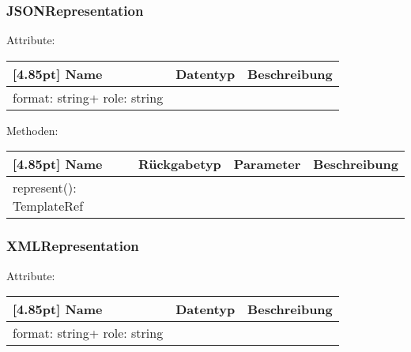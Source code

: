         	\subsubsection{JSONRepresentation}
        	
        	    Attribute:
                \begin{center}
                	\renewcommand{\arraystretch}{1.5}
                    \setlength\tabcolsep{5pt}
                	\begin{tabularx}{\textwidth}{|l|l|X|}
                		\hline
                        \rowcolor[gray]{0.75}[4.85pt]            		
                        Name & Datentyp & Beschreibung \\ \hline
                        format: string+ role: string
                        & &  \\ \hline
                	\end{tabularx}
                \end{center}
                
                Methoden:
        		\begin{center}
                \setlength\tabcolsep{5pt}
                	\renewcommand{\arraystretch}{1.5}
                    	\begin{tabularx}{\textwidth}{|l|l|l|X|}
                    	\hline
                    	\rowcolor[gray]{0.75}[4.85pt]
                		Name & Rückgabetyp & Parameter & Beschreibung \\ \hline
                		represent(): TemplateRef
                        & & &  \\ \hline
                        \end{tabularx}
        		\end{center}
        	
        	\subsubsection{XMLRepresentation}
        	
        	    Attribute:
                \begin{center}
                	\renewcommand{\arraystretch}{1.5}
                    \setlength\tabcolsep{5pt}
                	\begin{tabularx}{\textwidth}{|l|l|X|}
                		\hline
                        \rowcolor[gray]{0.75}[4.85pt]            		
                        Name & Datentyp & Beschreibung \\ \hline
                        format: string+ role: string
                        & &  \\ \hline
                	\end{tabularx}
                \end{center}
                
